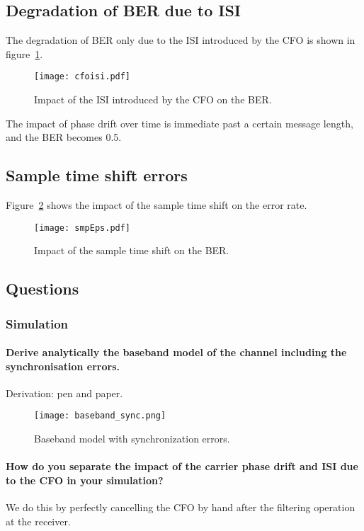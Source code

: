 \subsection{Degradation of BER due to ISI}
The degradation of BER only due to the ISI introduced by the CFO is shown in figure~\ref{fig:cfoisi}.
\begin{figure}[htbp]
\centering
\texttt{[image: cfoisi.pdf]}
\caption{Impact of the ISI introduced by the CFO on the BER.\label{fig:cfoisi}}
\end{figure}

The impact of phase drift over time is immediate past a certain message length, and the BER becomes 0.5.

\subsection{Sample time shift errors}
Figure~\ref{fig:smpEps} shows the impact of the sample time shift on the error rate.
\begin{figure}[htbp]
\centering
\texttt{[image: smpEps.pdf]}
\caption{Impact of the sample time shift on the BER.\label{fig:smpEps}}
\end{figure}

\subsection{Questions}
\subsubsection{Simulation}

\paragraph{Derive analytically the baseband model of the channel including the synchronisation errors.}
Derivation: pen and paper.
\begin{figure}[htbp]
\texttt{[image: baseband\_sync.png]}
\caption{Baseband model with synchronization errors.\label{fig:sync}}
\end{figure}


\paragraph{How do you separate the impact of the carrier phase drift and ISI due to the CFO in your simulation?}
We do this by perfectly cancelling the CFO by hand after the filtering operation at the receiver.

